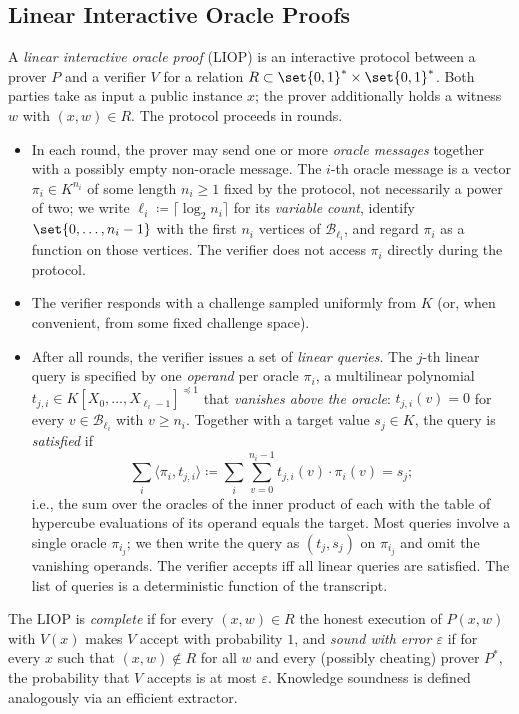 \documentclass{article}
\theoremstyle{definition}
\newcommand*{\mlin}{{\preceq 1}}
\newcommand{\BB}{\mathcal{B}}
\begin{document}
\subsection{Linear Interactive Oracle Proofs}
\label{sec:liop}

A \emph{linear interactive oracle proof} (LIOP) is an interactive protocol between a prover $P$ and a verifier $V$ for a relation $R \subset \set{0, 1}^* \times \set{0, 1}^*$. Both parties take as input a public instance $x$; the prover additionally holds a witness $w$ with $(x, w) \in R$. The protocol proceeds in rounds.

\begin{itemize}
\item In each round, the prover may send one or more \emph{oracle messages} together with a possibly empty non-oracle message. The $i$-th oracle message is a vector $\pi_i \in K^{n_i}$ of some length $n_i \geq 1$ fixed by the protocol, not necessarily a power of two; we write $\ell_i \coloneqq \lceil \log_2 n_i \rceil$ for its \emph{variable count}, identify $\set{0, \ldots, n_i - 1}$ with the first $n_i$ vertices of $\BB_{\ell_i}$, and regard $\pi_i$ as a function on those vertices. The verifier does not access $\pi_i$ directly during the protocol.
\item The verifier responds with a challenge sampled uniformly from $K$ (or, when convenient, from some fixed challenge space).
\item After all rounds, the verifier issues a set of \emph{linear queries}. The $j$-th linear query is specified by one \emph{operand} per oracle $\pi_i$, a multilinear polynomial $t_{j, i} \in K[X_0, \ldots, X_{\ell_i - 1}]^\mlin$ that \emph{vanishes above the oracle}: $t_{j, i}(v) = 0$ for every $v \in \BB_{\ell_i}$ with $v \ge n_i$. Together with a target value $s_j \in K$, the query is \emph{satisfied} if
\[
  \sum_i \langle \pi_i, t_{j, i} \rangle \coloneqq \sum_i \sum_{v = 0}^{n_i - 1} t_{j, i}(v) \cdot \pi_i(v) = s_j;
\]
i.e., the sum over the oracles of the inner product of each with the table of hypercube evaluations of its operand equals the target. Most queries involve a single oracle $\pi_{i_j}$; we then write the query as $(t_j, s_j)$ on $\pi_{i_j}$ and omit the vanishing operands. The verifier accepts iff all linear queries are satisfied. The list of queries is a deterministic function of the transcript.
\end{itemize}

The LIOP is \emph{complete} if for every $(x, w) \in R$ the honest execution of $P(x, w)$ with $V(x)$ makes $V$ accept with probability $1$, and \emph{sound with error $\varepsilon$} if for every $x$ such that $(x, w) \notin R$ for all $w$ and every (possibly cheating) prover $P^*$, the probability that $V$ accepts is at most $\varepsilon$. Knowledge soundness is defined analogously via an efficient extractor.
\end{document}
